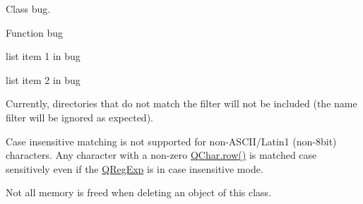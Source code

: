 
\begin{DoxyRefList}
\item[\label{bug__bug000004}%
\hypertarget{bug__bug000004}{}%
Classe \hyperlink{class_bug}{Bug} ]Class bug.  
\item[\label{bug__bug000005}%
\hypertarget{bug__bug000005}{}%
Global \hyperlink{class_bug_ac07863d69ae41a4e395b31f73b35fbcd}{Bug\-:\-:foo} ()]Function bug
\begin{DoxyItemize}
\item list item 1 in bug
\item list item 2 in bug 
\end{DoxyItemize}
\item[\label{bug__bug000002}%
\hypertarget{bug__bug000002}{}%
Global \hyperlink{class_q_dir_a4b4ed48f68e5fd116f09dcfb820f56f5}{Q\-Dir\-:\-:set\-Match\-All\-Dirs} (bool)]Currently, directories that do not match the filter will not be included (the name filter will be ignored as expected). 
\item[\label{bug__bug000003}%
\hypertarget{bug__bug000003}{}%
Classe \hyperlink{class_q_reg_exp}{Q\-Reg\-Exp} ]Case insensitive matching is not supported for non-\/\-A\-S\-C\-I\-I/\-Latin1 (non-\/8bit) characters. Any character with a non-\/zero \hyperlink{class_q_char_aa0362ae052f9a76a268e0d23859a62f5}{Q\-Char.\-row()} is matched case sensitively even if the \hyperlink{class_q_reg_exp}{Q\-Reg\-Exp} is in case insensitive mode. 
\item[\label{bug__bug000001}%
\hypertarget{bug__bug000001}{}%
Classe \hyperlink{class_some_nice_class}{Some\-Nice\-Class} ]Not all memory is freed when deleting an object of this class. 
\end{DoxyRefList}